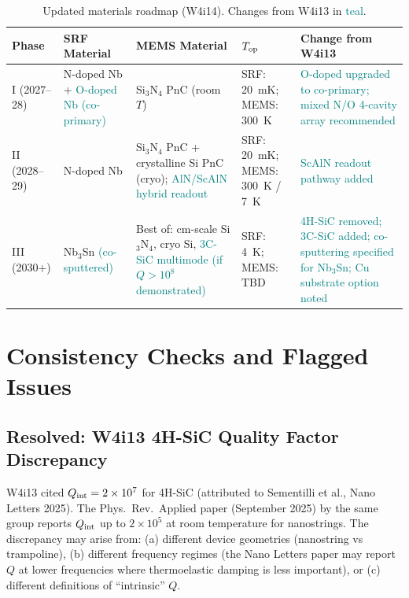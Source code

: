 \documentclass[11pt]{article}
\theoremstyle{definition}
\theoremstyle{remark}
\newcommand{\ee}[1]{\times 10^{#1}}
\begin{document}
\begin{table}[H]
\centering
\caption{Updated materials roadmap (W4i14). Changes from W4i13 in
\textcolor{teal}{teal}.}
\label{tab:roadmap}
\renewcommand{\arraystretch}{1.3}
\begin{tabular}{p{2cm}p{3cm}p{2.5cm}p{2cm}p{3cm}}
\toprule
\textbf{Phase} & \textbf{SRF Material} & \textbf{MEMS Material} &
\textbf{$T_{\rm op}$} & \textbf{Change from W4i13} \\
\midrule
I (2027--28) &
  N-doped Nb + \textcolor{teal}{O-doped Nb (co-primary)} &
  Si$_3$N$_4$ PnC (room $T$) &
  SRF: 20~mK; MEMS: 300~K &
  \textcolor{teal}{O-doped upgraded to co-primary; mixed
  N/O 4-cavity array recommended} \\
\midrule
II (2028--29) &
  N-doped Nb &
  Si$_3$N$_4$ PnC + crystalline Si PnC (cryo);
  \textcolor{teal}{AlN/ScAlN hybrid readout} &
  SRF: 20~mK; MEMS: 300~K / 7~K &
  \textcolor{teal}{ScAlN readout pathway added} \\
\midrule
III (2030+) &
  Nb$_3$Sn \textcolor{teal}{(co-sputtered)} &
  Best of: cm-scale Si$_3$N$_4$, cryo Si,
  \textcolor{teal}{3C-SiC multimode (if $Q > 10^8$ demonstrated)} &
  SRF: 4~K; MEMS: TBD &
  \textcolor{teal}{4H-SiC removed; 3C-SiC added; co-sputtering
  specified for Nb$_3$Sn; Cu substrate option noted} \\
\bottomrule
\end{tabular}
\end{table}


\section{Consistency Checks and Flagged Issues}
\label{sec:consistency}

\subsection{Resolved: W4i13 4H-SiC Quality Factor Discrepancy}

W4i13 cited $Q_{\rm int} = 2\ee{7}$ for 4H-SiC (attributed to
Sementilli et al., Nano Letters 2025). The Phys.\ Rev.\ Applied
paper (September 2025) by the same group reports $Q_{\rm int}$ up to
$2\ee{5}$ at room temperature for nanostrings. The discrepancy may
arise from: (a) different device geometries (nanostring vs trampoline),
(b) different frequency regimes (the Nano Letters paper may report
$Q$ at lower frequencies where thermoelastic damping is less
important), or (c) different definitions of ``intrinsic'' $Q$.
\end{document}
